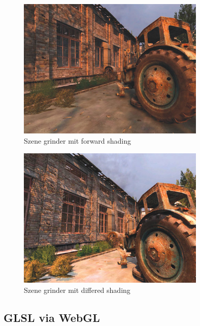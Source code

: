 \begin{figure}[H]
    \centering
    \includegraphics[width=0.8\textwidth]{images/deferred_shading_off.jpg}
    \caption{Szene grinder mit forward shading} %
    \label{fig:defferedshading}
\end{figure}



\begin{figure}[H]
    \centering
    \includegraphics[width=0.8\textwidth]{images/deferred_shading_on.jpg}
    \caption{Szene grinder mit  differed shading} %
    \label{fig:defferedshading}
\end{figure}



\subsection{GLSL via WebGL}
